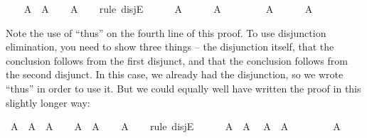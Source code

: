 \begin{isabellebody}
\isanewline
\ \ \isamarkupfalse%
\ {\isachardoublequoteopen}A\ {\isasymor}\ A{\isachardoublequoteclose}\isanewline
\ \ \isamarkupfalse%
\ {\isachardoublequoteopen}A{\isachardoublequoteclose}\isanewline
\ \ \isamarkupfalse%
\ {\isacharparenleft}rule\ disjE{\isacharparenright}\isanewline
\ \ \ \ \isamarkupfalse%
\ {\isachardoublequoteopen}A{\isachardoublequoteclose}\isanewline
\ \ \ \ \isamarkupfalse%
\ {\isachardoublequoteopen}A{\isachardoublequoteclose}\isacommand{{\isachardot}}\isamarkupfalse%
\isanewline
\ \ \isamarkupfalse%
\isanewline
\ \ \ \ \isamarkupfalse%
\ {\isachardoublequoteopen}A{\isachardoublequoteclose}\isanewline
\ \ \ \ \isamarkupfalse%
\ {\isachardoublequoteopen}A{\isachardoublequoteclose}\isacommand{{\isachardot}}\isamarkupfalse%
\isanewline
\ \ \isamarkupfalse%
\isanewline
{}\isamarkupfalse%
%
\endisatagproof
{\isafoldproof}%
%
\isadelimproof
%
\endisadelimproof
%
\begin{isamarkuptext}%
Note the use of ``thus'' on the fourth line of this proof. To use disjunction elimination,
you need to show three things -- the disjunction itself, that the conclusion follows from the first
disjunct, and that the conclusion follows from the second disjunct. In this case, we already had the
disjunction, so we wrote ``thus'' in order to use it. But we could equally well have written the
proof in this slightly longer way:%
\end{isamarkuptext}\isamarkuptrue%
\isamarkupfalse%
\ {\isachardoublequoteopen}A\ {\isasymor}\ A\ {\isasymlongrightarrow}\ A{\isachardoublequoteclose}\isanewline
%
\isadelimproof
%
\endisadelimproof
%
\isatagproof
{}\isamarkupfalse%
\isanewline
\ \ \isamarkupfalse%
\ {\isachardoublequoteopen}A\ {\isasymor}\ A{\isachardoublequoteclose}\isanewline
\ \ \isamarkupfalse%
\ {\isachardoublequoteopen}A{\isachardoublequoteclose}\isanewline
\ \ \isamarkupfalse%
\ {\isacharparenleft}rule\ disjE{\isacharparenright}\isanewline
\ \ \ \ \isamarkupfalse%
\ {\isachardoublequoteopen}A\ {\isasymor}\ A{\isachardoublequoteclose}\ \isamarkupfalse%
\ {\isacharbackquoteopen}A\ {\isasymor}\ A{\isacharbackquoteclose}\isacommand{{\isachardot}}\isamarkupfalse%
\isanewline
\ \ \isamarkupfalse%
\isanewline
\ \ \ \ \isamarkupfalse%
\ {\isachardoublequoteopen}A{\isachardoublequoteclose}\isanewline

\end{isabellebody}
